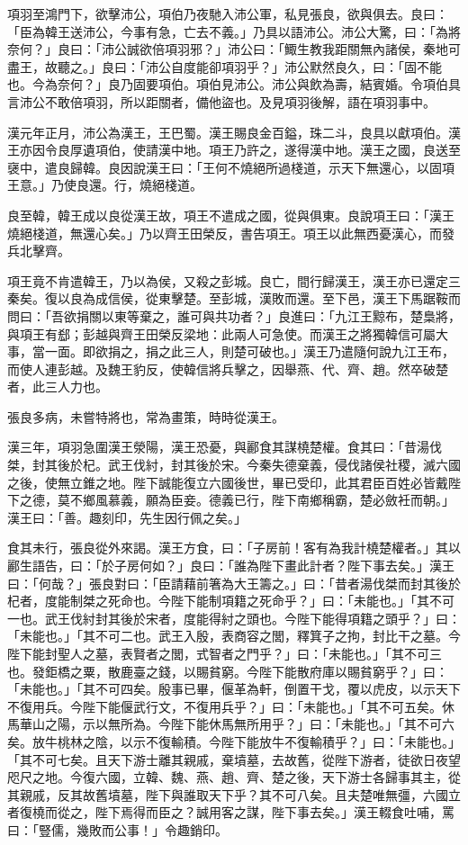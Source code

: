\begin{pinyinscope}
項羽至鴻門下，欲擊沛公，項伯乃夜馳入沛公軍，私見張良，欲與俱去。良曰：「臣為韓王送沛公，今事有急，亡去不義。」乃具以語沛公。沛公大驚，曰：「為將奈何？」良曰：「沛公誠欲倍項羽邪？」沛公曰：「鯫生教我距關無內諸侯，秦地可盡王，故聽之。」良曰：「沛公自度能卻項羽乎？」沛公默然良久，曰：「固不能也。今為奈何？」良乃固要項伯。項伯見沛公。沛公與飲為壽，結賓婚。令項伯具言沛公不敢倍項羽，所以距關者，備他盜也。及見項羽後解，語在項羽事中。

漢元年正月，沛公為漢王，王巴蜀。漢王賜良金百鎰，珠二斗，良具以獻項伯。漢王亦因令良厚遺項伯，使請漢中地。項王乃許之，遂得漢中地。漢王之國，良送至襃中，遣良歸韓。良因說漢王曰：「王何不燒絕所過棧道，示天下無還心，以固項王意。」乃使良還。行，燒絕棧道。

良至韓，韓王成以良從漢王故，項王不遣成之國，從與俱東。良說項王曰：「漢王燒絕棧道，無還心矣。」乃以齊王田榮反，書告項王。項王以此無西憂漢心，而發兵北擊齊。

項王竟不肯遣韓王，乃以為侯，又殺之彭城。良亡，間行歸漢王，漢王亦已還定三秦矣。復以良為成信侯，從東擊楚。至彭城，漢敗而還。至下邑，漢王下馬踞鞍而問曰：「吾欲捐關以東等棄之，誰可與共功者？」良進曰：「九江王黥布，楚梟將，與項王有郄；彭越與齊王田榮反梁地：此兩人可急使。而漢王之將獨韓信可屬大事，當一面。即欲捐之，捐之此三人，則楚可破也。」漢王乃遣隨何說九江王布，而使人連彭越。及魏王豹反，使韓信將兵擊之，因舉燕、代、齊、趙。然卒破楚者，此三人力也。

張良多病，未嘗特將也，常為畫策，時時從漢王。

漢三年，項羽急圍漢王滎陽，漢王恐憂，與酈食其謀橈楚權。食其曰：「昔湯伐桀，封其後於杞。武王伐紂，封其後於宋。今秦失德棄義，侵伐諸侯社稷，滅六國之後，使無立錐之地。陛下誠能復立六國後世，畢已受印，此其君臣百姓必皆戴陛下之德，莫不鄉風慕義，願為臣妾。德義已行，陛下南鄉稱霸，楚必斂衽而朝。」漢王曰：「善。趣刻印，先生因行佩之矣。」

食其未行，張良從外來謁。漢王方食，曰：「子房前！客有為我計橈楚權者。」其以酈生語告，曰：「於子房何如？」良曰：「誰為陛下畫此計者？陛下事去矣。」漢王曰：「何哉？」張良對曰：「臣請藉前箸為大王籌之。」曰：「昔者湯伐桀而封其後於杞者，度能制桀之死命也。今陛下能制項籍之死命乎？」曰：「未能也。」「其不可一也。武王伐紂封其後於宋者，度能得紂之頭也。今陛下能得項籍之頭乎？」曰：「未能也。」「其不可二也。武王入殷，表商容之閭，釋箕子之拘，封比干之墓。今陛下能封聖人之墓，表賢者之閭，式智者之門乎？」曰：「未能也。」「其不可三也。發鉅橋之粟，散鹿臺之錢，以賜貧窮。今陛下能散府庫以賜貧窮乎？」曰：「未能也。」「其不可四矣。殷事已畢，偃革為軒，倒置干戈，覆以虎皮，以示天下不復用兵。今陛下能偃武行文，不復用兵乎？」曰：「未能也。」「其不可五矣。休馬華山之陽，示以無所為。今陛下能休馬無所用乎？」曰：「未能也。」「其不可六矣。放牛桃林之陰，以示不復輸積。今陛下能放牛不復輸積乎？」曰：「未能也。」「其不可七矣。且天下游士離其親戚，棄墳墓，去故舊，從陛下游者，徒欲日夜望咫尺之地。今復六國，立韓、魏、燕、趙、齊、楚之後，天下游士各歸事其主，從其親戚，反其故舊墳墓，陛下與誰取天下乎？其不可八矣。且夫楚唯無彊，六國立者復橈而從之，陛下焉得而臣之？誠用客之謀，陛下事去矣。」漢王輟食吐哺，罵曰：「豎儒，幾敗而公事！」令趣銷印。


\end{pinyinscope}
